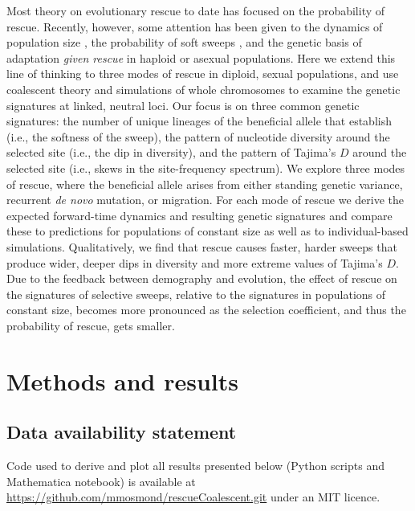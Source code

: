 \documentclass[]{article}
\begin{document}
Most theory on evolutionary rescue to date \citep[reviewed in][]{alexander2014evolutionary} has focused on the probability of rescue.
Recently, however, some attention has been given to the dynamics of population size \citep{orr2014population}, the probability of soft sweeps \citep{wilson2017soft}, and the genetic basis of adaptation \citep{osmond2019genetic} \textit{given rescue} in haploid or asexual populations.
Here we extend this line of thinking to three modes of rescue in diploid, sexual populations, and use coalescent theory and simulations of whole chromosomes to examine the genetic signatures at linked, neutral loci.
Our focus is on three common genetic signatures: the number of unique lineages of the beneficial allele that establish (i.e., the softness of the sweep), the pattern of nucleotide diversity around the selected site (i.e., the dip in diversity), and the pattern of Tajima's $D$ around the selected site (i.e., skews in the site-frequency spectrum).
We explore three modes of rescue, where the beneficial allele arises from either standing genetic variance, recurrent \textit{de novo} mutation, or migration.
For each mode of rescue we derive the expected forward-time dynamics and resulting genetic signatures and compare these to predictions for populations of constant size as well as to individual-based simulations.
Qualitatively, we find that rescue causes faster, harder sweeps that produce wider, deeper dips in diversity and more extreme values of Tajima's $D$.
Due to the feedback between demography and evolution, the effect of rescue on the signatures of selective sweeps, relative to the signatures in populations of constant size, becomes more pronounced as the selection coefficient, and thus the probability of rescue, gets smaller.

\section*{Methods and results}
\label{sec:methods}

\subsection*{Data availability statement}
\label{sec:data}

Code used to derive and plot all results presented below (Python scripts and Mathematica notebook) is available at \url{https://github.com/mmosmond/rescueCoalescent.git} under an MIT licence.
\end{document}
